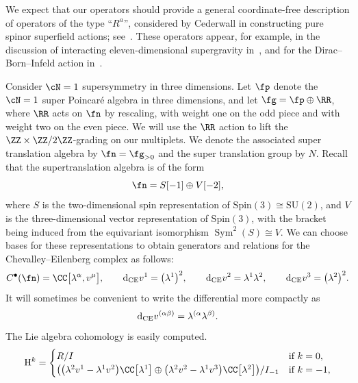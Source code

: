 \documentclass[10pt,a4paper]{amsart}
\numberwithin{equation}{section}
\def\d{{\rm d}}
\DeclareMathOperator{\Sym}{Sym}
\begin{document}
We expect that our operators should provide a general coordinate-free description of operators of the type ``$R^a$'', considered by Cederwall in constructing pure spinor superfield actions; see~\cite{Ced-ops}. These operators appear, for example, in the discussion of interacting eleven-dimensional supergravity in~\cite{Ced-11d, Ced-towards}, and for the Dirac--Born--Infeld action in~\cite{CederwallKarlsson}.

\begin{eg}
	Consider $\cN=1$ supersymmetry in three dimensions. Let $\fp$ denote the $\cN=1$ super Poincar\'e algebra in three dimensions, and let $\fg = \fp \oplus \RR$, where $\RR$ acts on $\fn$ by rescaling, with weight one on the odd piece and with weight two on the even piece. We will use the $\RR$ action to lift the $\ZZ \times \ZZ/2\ZZ$-grading on our multiplets. We denote the associated super translation algebra by $\fn= \fg_{>0}$ and the super translation group by $N$.
	Recall that the supertranslation algebra is of the form
	\begin{equation*}
	\fn = S[-1] \oplus V[-2],
	\end{equation*}
	where $S$ is the two-dimensional spin representation of $\mathrm{Spin}(3) \cong \mathrm{SU}(2)$, and $V$ is the three-dimensional vector representation of $\mathrm{Spin}(3)$, with the bracket being induced from the equivariant isomorphism $\Sym^2(S) \cong V$. We can choose bases for these representations to obtain generators and relations for the Chevalley--Eilenberg complex as follows:
	\begin{equation*}
	C^\bullet(\fn) = \CC\big[\lambda^\alpha , v^\mu\big], \qquad \d_{\mathrm{CE}}v^1 = \big(\lambda^1\big)^2 ,\qquad \d_{\mathrm{CE}}v^2 = \lambda^1 \lambda^2, \qquad \d_{\mathrm{CE}}v^3 = \big(\lambda^2\big)^2 .
	\end{equation*}
	It will sometimes be convenient to write the differential more compactly as
	\begin{equation*}
	\d_{\mathrm{CE}}v^{(\alpha \beta)} = \lambda^{(\alpha} \lambda^{\beta)} .
	\end{equation*}
	The Lie algebra cohomology is easily computed.
	\begin{equation*}
	\mathrm H^k = \begin{cases}
	R/I & \text{if } k=0, \\
	\big(\big(\lambda^2 v^1 - \lambda^1 v^2\big) \CC\big[\lambda^1\big] \oplus \big(\lambda^2 v^2 - \lambda^1 v^3\big) \CC\big[\lambda^2\big] \big)/ I_{-1} & \text{if } k=-1, \\

\end{cases}
\end{equation*}
\end{eg}
\end{document}

